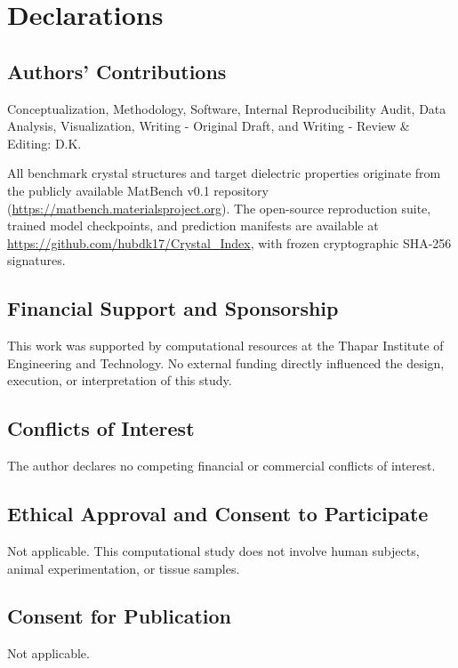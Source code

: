 \documentclass[journal,article,submit,moreauthors,pdftex]{article}
\begin{document}
\section*{Declarations}

\subsection*{Authors' Contributions}
Conceptualization, Methodology, Software, Internal Reproducibility Audit, Data Analysis, Visualization, Writing - Original Draft, and Writing - Review \& Editing: D.K.

All benchmark crystal structures and target dielectric properties originate from the publicly available MatBench v0.1 repository (\url{https://matbench.materialsproject.org}). The open-source reproduction suite, trained model checkpoints, and prediction manifests are available at \url{https://github.com/hubdk17/Crystal_Index}, with frozen cryptographic SHA-256 signatures.

\subsection*{Financial Support and Sponsorship}
This work was supported by computational resources at the Thapar Institute of Engineering and Technology. No external funding directly influenced the design, execution, or interpretation of this study.

\subsection*{Conflicts of Interest}
The author declares no competing financial or commercial conflicts of interest.

\subsection*{Ethical Approval and Consent to Participate}
Not applicable. This computational study does not involve human subjects, animal experimentation, or tissue samples.

\subsection*{Consent for Publication}
Not applicable.

\begingroup
\small


\endgroup
\end{document}
